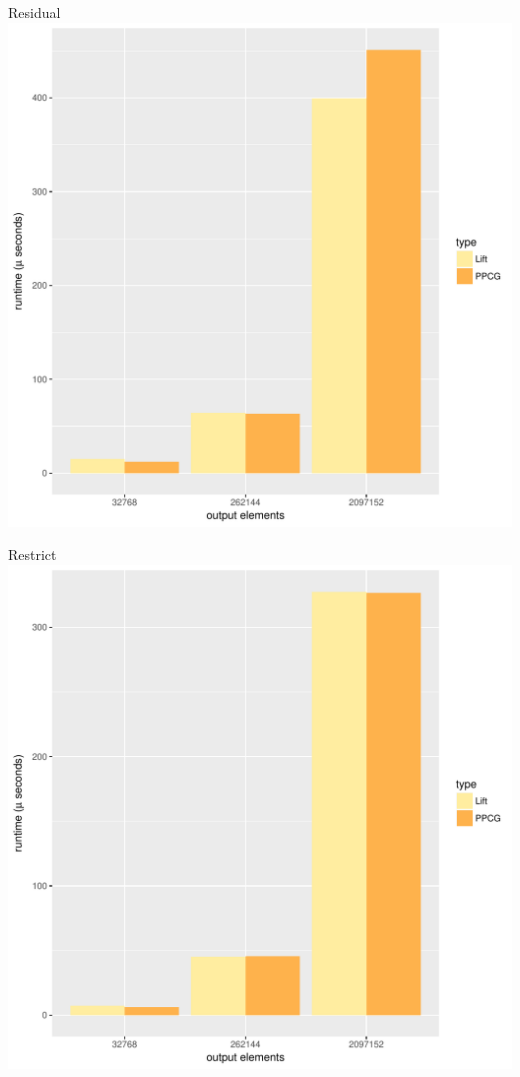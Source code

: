 \documentclass{beamer}
\begin{document}
\begin{frame}{Residual}
	\center
	\includegraphics[scale=0.35]{img/plots/residual.pdf}
\end{frame}

\begin{frame}{Restrict}
	\center
	\includegraphics[scale=0.35]{img/plots/restrict.pdf}
\end{frame}
\end{document}
